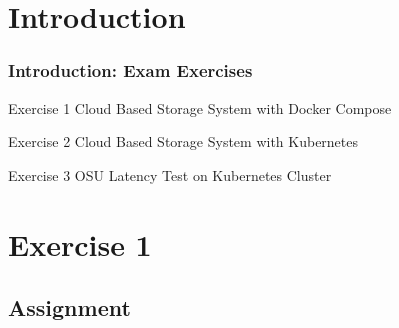 \documentclass[xcolor=table,fontsize=10pt]{beamer}
\title{\bft{Cloud Based Storage System}}
\subtitle{\small{\bft{CLOUD COMPUTING EXAM}}}
\author{Marco Tallone}
\date{September, 2024}
\begin{document}
\frame{\titlepage} %


\section{Introduction}

\begin{frame}
	\frametitle{Introduction: Exam Exercises}

		\begin{block}{Exercise 1 \hfill {}}
			Cloud Based Storage System with Docker Compose \hfill {}
		\end{block}

		\begin{block}{Exercise 2 \hfill {}}
			Cloud Based Storage System with Kubernetes \hfill {}
		\end{block}

		\begin{block}{Exercise 3 \hfill {}}
			OSU Latency Test on Kubernetes Cluster \hfill {}
		\end{block}
\end{frame}
\section{Exercise 1}
\subsection{Assignment}
\end{document}
